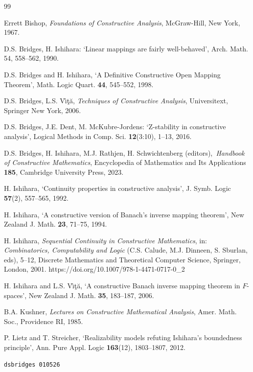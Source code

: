 \documentclass[11pt]{article}%
\begin{document}
\begin{thebibliography}{99}                                                                                               %


Errett Bishop, \emph{Foundations of Constructive Analysis},
McGraw-Hill, New York, 1967.

D.S. Bridges, H. Ishihara: `Linear mappings are fairly
well-behaved', Arch. Math. 54, 558--562, 1990.

D.S. Bridges and H. Ishihara, `A Definitive Constructive Open
Mapping Theorem', Math. Logic Quart. \textbf{44}, 545--552, 1998.

D.S. Bridges, L.S. V\^{\i}\c{t}\u{a}, \emph{Techniques of
Constructive Analysis}, Universitext, Springer New York, 2006.

D.S. Bridges, J.E. Dent, M. McKubre-Jordens: `Z-stability in
constructive analysis', Logical Methods in Comp. Sci. \textbf{12}(3:10),
1--13, 2016.

D.S. Bridges, H. Ishihara, M.J. Rathjen, H. Schwichtenberg
(editors),\emph{\ Handbook of Constructive Mathematics}, Encyclopedia of
Mathematics and Its Applications \textbf{185}, Cambridge University Press, 2023.

H. Ishihara, `Continuity properties in constructive
analysis', J. Symb. Logic \textbf{57}(2), 557--565, 1992.

H. Ishihara, `A constructive version of Banach's inverse
mapping theorem', New Zealand J. Math. \textbf{23}, 71--75, 1994.

H. Ishihara, \emph{Sequential Continuity in Constructive
Mathematics}, in: \emph{Combinatorics, Computability and Logic} (C.S. Calude,
M.J. Dinneen, S. Sburlan, eds), 5--12, Discrete Mathematics and Theoretical
Computer Science, Springer, London, 2001. https://doi.org/10.1007/978-1-4471-0717-0\_2

H. Ishihara and L.S. V\^{\i}\c{t}\u{a}, `A constructive Banach
inverse mapping theorem in $F$-spaces', New Zealand J. Math. \textbf{35},
183--187, 2006.

B.A. Kushner, \emph{Lectures on Constructive Mathematical
Analysis}, Amer. Math. Soc., Providence RI, 1985.

P. Lietz and T. Streicher, `Realizability models refuting
Ishihara's boundedness principle', Ann. Pure Appl. Logic \textbf{163}(12),
1803--1807, 2012.
\end{thebibliography}

\vfill


\begin{flushright}
\texttt{{\small dsbridges 010526}}
\end{flushright}

\label{end}
\end{document}
